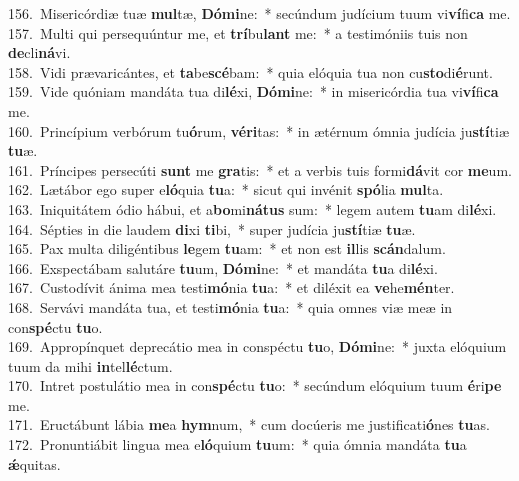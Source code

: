 {156.~}Misericórdiæ tuæ \textbf{mul}tæ, \textbf{Dó}\textbf{mi}ne:~* secúndum judícium tuum vi\textbf{ví}fi\textbf{ca} me.\\
{157.~}Multi qui persequúntur me, et \textbf{trí}bu\textbf{lant} me:~* a testimóniis tuis non \textbf{de}cli\textbf{ná}vi.\\
{158.~}Vidi prævaricántes, et \textbf{ta}be\textbf{scé}bam:~* quia elóquia tua non cu\textbf{sto}di\textbf{é}runt.\\
{159.~}Vide quóniam mandáta tua di\textbf{lé}xi, \textbf{Dó}\textbf{mi}ne:~* in misericórdia tua vi\textbf{ví}fi\textbf{ca} me.\\
{160.~}Princípium verbórum tu\textbf{ó}rum, \textbf{vé}\textbf{ri}tas:~* in ætérnum ómnia judícia ju\textbf{stí}tiæ \textbf{tu}æ.\\
{161.~}Príncipes persecúti \textbf{sunt} me \textbf{gra}tis:~* et a verbis tuis formi\textbf{dá}vit cor \textbf{me}um.\\
{162.~}Lætábor ego super e\textbf{ló}quia \textbf{tu}a:~* sicut qui invénit \textbf{spó}lia \textbf{mul}ta.\\
{163.~}Iniquitátem ódio hábui, et a\textbf{bo}mi\textbf{ná}\textbf{tus} sum:~* legem autem \textbf{tu}am di\textbf{lé}xi.\\
{164.~}Sépties in die laudem \textbf{di}xi \textbf{ti}bi,~* super judícia ju\textbf{stí}tiæ \textbf{tu}æ.\\
{165.~}Pax multa diligéntibus \textbf{le}gem \textbf{tu}am:~* et non est \textbf{il}lis \textbf{scán}dalum.\\
{166.~}Exspectábam salutáre \textbf{tu}um, \textbf{Dó}\textbf{mi}ne:~* et mandáta \textbf{tu}a di\textbf{lé}xi.\\
{167.~}Custodívit ánima mea testi\textbf{mó}nia \textbf{tu}a:~* et diléxit ea \textbf{ve}he\textbf{mén}ter.\\
{168.~}Servávi mandáta tua, et testi\textbf{mó}nia \textbf{tu}a:~* quia omnes viæ meæ in con\textbf{spé}ctu \textbf{tu}o.\\
{169.~}Appropínquet deprecátio mea in conspéctu \textbf{tu}o, \textbf{Dó}\textbf{mi}ne:~* juxta elóquium tuum da mihi \textbf{in}tel\textbf{lé}ctum.\\
{170.~}Intret postulátio mea in con\textbf{spé}ctu \textbf{tu}o:~* secúndum elóquium tuum \textbf{é}ri\textbf{pe} me.\\
{171.~}Eructábunt lábia \textbf{me}a \textbf{hym}num,~* cum docúeris me justificati\textbf{ó}nes \textbf{tu}as.\\
{172.~}Pronuntiábit lingua mea e\textbf{ló}quium \textbf{tu}um:~* quia ómnia mandáta \textbf{tu}a \textbf{ǽ}quitas.\\
